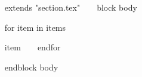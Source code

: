 ~{ extends "section.tex" }~
~{ block body }~
\begin{items}
  ~{ for item in items }~
    \item{~{{ item }}~}
  ~{ endfor }~
\end{items}
~{ endblock body }~
